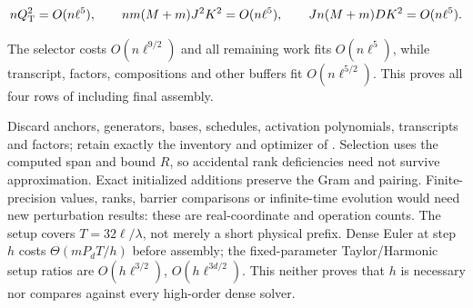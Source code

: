 \[
nQ_{\rm T}^2=O(n\ell^5),\qquad
nm(M+m)J^2K^2=O(n\ell^5),\qquad
Jn(M+m)DK^2=O(n\ell^5).
\]

The selector costs $O(n\ell^{9/2})$ and all remaining work fits
$O(n\ell^5)$, while transcript, factors, compositions and other
buffers fit $O(n\ell^{5/2})$. This proves all four rows of
 including final assembly.

Discard anchors, generators, bases, schedules, activation polynomials,
transcripts and factors; retain exactly the inventory and optimizer of
. Selection uses the computed span and bound $R$,
so accidental rank deficiencies need not survive approximation.
Exact initialized additions preserve the Gram and pairing. Finite-precision
values, ranks, barrier comparisons or infinite-time evolution would need
new perturbation results: these are real-coordinate and operation counts.
The setup covers $T=32\ell/\lambda$, not merely a short physical prefix.
Dense Euler at step $h$ costs $\Theta(mP_dT/h)$ before assembly;
the fixed-parameter Taylor/Harmonic setup ratios are
$O(h\ell^{3/2})$, $O(h\ell^{3d/2})$. This neither proves that $h$
is necessary nor compares against every high-order dense solver.
